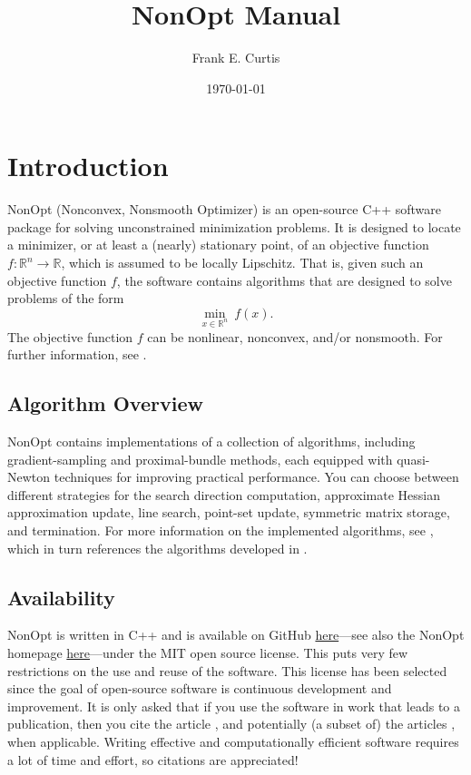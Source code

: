 \documentclass{article}
\title{NonOpt Manual}
\author{Frank E. Curtis}
\date{\today}
\begin{document}
\maketitle
\tableofcontents

\section{Introduction}

NonOpt (Nonconvex, Nonsmooth Optimizer) is an open-source C++ software package for solving unconstrained minimization problems.  It is designed to locate a minimizer, or at least a (nearly) stationary point, of an objective function $f : \mathbb{R}^n \to \mathbb{R}{}$, which is assumed to be locally Lipschitz.  That is, given such an objective function $f$, the software contains algorithms that are designed to solve problems of the form
\begin{equation*}
  \min_{x \in \mathbb{R}^n}\ f(x).
\end{equation*}
The objective function $f$ can be nonlinear, nonconvex, and/or nonsmooth.  For further information, see \cite{CurtZebi2025}.

\subsection{Algorithm Overview}

NonOpt contains implementations of a collection of algorithms, including gradient-sampling and proximal-bundle methods, each equipped with quasi-Newton techniques for improving practical performance.  You can choose between different strategies for the search direction computation, approximate Hessian approximation update, line search, point-set update, symmetric matrix storage, and termination.  For more information on the implemented algorithms, see \cite{CurtZebi2025}, which in turn references the algorithms developed in \cite{CurtLi22,CurtQue13,CurtQue15,CurtRobiZhou20}.

\subsection{Availability}

NonOpt is written in C++ and is available on GitHub \href{https://github.com/frankecurtis/NonOpt}{here}---see also the NonOpt homepage \href{https://sufficientdescent.github.io/nonopt}{here}---under the MIT open source license. This puts very few restrictions on the use and reuse of the software. This license has been selected since the goal of open-source software is continuous development and improvement.  It is only asked that if you use the software in work that leads to a publication, then you cite the article \cite{CurtZebi2025}, and potentially (a subset of) the articles \cite{CurtLi22,CurtQue13,CurtQue15,CurtRobiZhou20}, when applicable.  Writing effective and computationally efficient software requires a lot of time and effort, so citations are appreciated!
\end{document}
